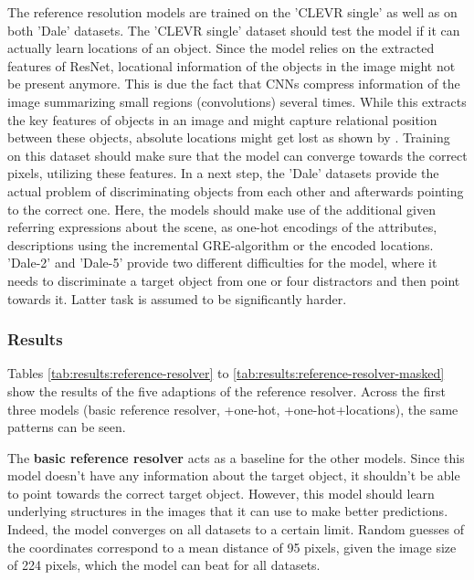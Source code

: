 The reference resolution models are trained on the 'CLEVR single' as well as on both 'Dale' datasets.
The 'CLEVR single' dataset should test the model if it can actually learn locations of an object.
Since the model relies on the extracted features of ResNet, locational information of the objects in the image might not be present anymore.
This is due the fact that CNNs compress information of the image summarizing small regions (convolutions) several times.
While this extracts the key features of objects in an image and might capture relational position between these objects, absolute locations might get lost as shown by \citet{Kelleher2017}.
Training on this dataset should make sure that the model can converge towards the correct pixels, utilizing these features.
In a next step, the 'Dale' datasets provide the actual problem of discriminating objects from each other and afterwards pointing to the correct one.
Here, the models should make use of the additional given referring expressions about the scene, as one-hot encodings of the attributes, descriptions using the incremental GRE-algorithm or the encoded locations.
'Dale-2' and 'Dale-5' provide two different difficulties for the model, where it needs to discriminate a target object from one or four distractors and then point towards it.
Latter task is assumed to be significantly harder.

\subsubsection*{Results}

Tables \ref{tab:results:reference-resolver} to \ref{tab:results:reference-resolver-masked} show the results of the five adaptions of the reference resolver.
Across the first three models (basic reference resolver, +one-hot, +one-hot+locations), the same patterns can be seen.

The \textbf{basic reference resolver} acts as a baseline for the other models.
Since this model doesn't have any information about the target object, it shouldn't be able to point towards the correct target object.
However, this model should learn underlying structures in the images that it can use to make better predictions.
Indeed, the model converges on all datasets to a certain limit.
Random guesses of the coordinates correspond to a mean distance of 95 pixels, given the image size of 224 pixels, which the model can beat for all datasets.

